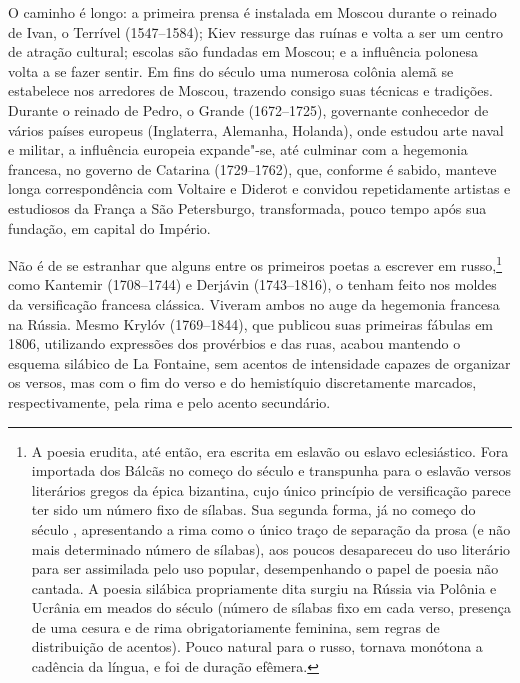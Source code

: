 O caminho é longo: a primeira prensa é instalada em Moscou durante o
rei­nado de Ivan, o Terrível (1547--1584); Kiev ressurge das ruínas e
volta a ser um centro de atração cultural; escolas são fundadas em
Moscou; e a influência po­lonesa volta a se fazer sentir. Em fins do
século  uma numerosa colônia alemã se estabelece nos arredores de
Moscou, trazendo consigo suas técnicas e tradições. Durante o reinado de
Pedro, o Grande (1672--1725), governante co­nhecedor de vários países
europeus (Inglaterra, Alemanha, Holanda), onde es­tudou arte naval e
militar, a influência europeia expande"-se, até culminar com a hegemonia
francesa, no governo de Catarina  (1729--1762), que, conforme é sabido,
manteve longa correspondência com Voltaire e Diderot e convidou
re­petidamente artistas e estudiosos da França a São Petersburgo,
transformada, pouco tempo após sua fundação, em
capital do Império.

Não é de se estranhar que alguns entre os primeiros poetas a escrever em
rus­so,\footnote{A poesia erudita, até então, era escrita em eslavão ou eslavo eclesiástico. Fora importada dos Bálcãs no começo do século  e transpunha para o eslavão versos literários gregos da épica bizantina, cujo único princípio de versificação parece ter sido um número fixo de sílabas. Sua segunda forma, já no começo do século , apresentando a rima como o único traço de separação da prosa (e não mais determinado número de sílabas), aos poucos desapareceu do uso literário para ser assimilada pelo uso popular, desempenhando o papel de poesia não cantada. A poesia silábica propriamente dita surgiu na Rússia via Polônia e Ucrânia em meados do século  (número de sílabas fixo em cada verso, presença de uma cesura e de rima obrigatoriamente feminina, sem regras de distribuição de acentos). Pouco natural para o russo, tornava monótona a cadência da língua, e foi de duração efêmera.} como Kantemir (1708--1744) e Derjávin (1743--1816), o tenham feito nos moldes da versificação fran­cesa clássica. Viveram ambos no auge da hegemonia
francesa na Rússia. Mesmo Krylóv (1769--1844), que publicou suas primeiras fábulas em 1806, utilizando expressões dos provérbios e das ruas, acabou man­tendo o esquema silábico de La
Fontaine, sem acentos de intensidade capazes de organizar os versos, mas com o fim do verso e do hemistíquio discreta­mente marcados, respectivamente, pela rima e pelo acento secundário.

